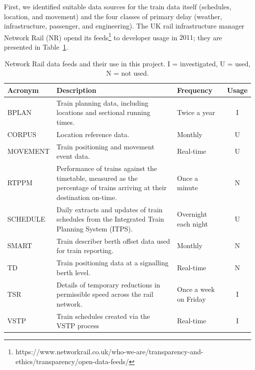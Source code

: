 \documentclass[12pt,a4paper]{article}
\begin{document}
First, we identified suitable data sources for the train data itself (schedules, location, and movement) and the four classes of primary delay (weather, infrastructure, passenger, and engineering). The UK rail infrastructure manager Network Rail (NR) opend its feeds\footnote{https://www.networkrail.co.uk/who-we-are/transparency-and-ethics/transparency/open-data-feeds/} to developer usage in $2011$; they are presented in Table~\ref{table:nr_feeds}.

\begin{table}[htb]
\centering
\caption{Network Rail data feeds and their use in this project. I = investigated, U = used, N = not used.}
\label{table:nr_feeds}
\begin{tabular}{|l|p{8cm}|p{2cm}|c|}
\hline
\textbf{Acronym} & \textbf{Description} & \textbf{Frequency} & \multicolumn{1}{l|}{\textbf{Usage}} \\ \hline
BPLAN & Train planning data, including locations and sectional running times. & Twice a year & I \\ \hline
CORPUS & Location reference data. & Monthly & U \\ \hline
MOVEMENT & Train positioning and movement event data. & Real-time & U \\ \hline
RTPPM & Performance of trains against the timetable, measured as the percentage of trains arriving at their destination on-time. & Once a minute         & N \\ \hline
SCHEDULE         & Daily extracts and updates of train schedules from the Integrated Train Planning System (ITPS).                          & Overnight each night  & U                                       \\ \hline
SMART            & Train describer berth offset data used for train reporting.                                                              & Monthly               & N                                       \\ \hline
TD               & Train positioning data at a signalling berth level.                                                                      & Real-time             & N                                       \\ \hline
TSR              & Details of temporary reductions in permissible speed across the rail network.                                            & Once a week on Friday & I                                       \\ \hline
VSTP             & Train schedules created via the VSTP process                                                                             & Real-time             & I                                       \\ \hline
\end{tabular}
\end{table}
\end{document}
